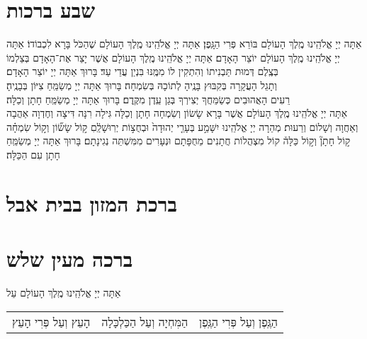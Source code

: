 \documentclass[twoside, openany, parskip=half, 11pt]{book}
\begin{document}
\section[שבע ברכות]{ שבע ברכות }

אַתָּה יְיָ אֱלֹהֵֽינוּ מֶֽלֶךְ הָעוֹלָם בּוֹרֵא פְּרִי הַגָּֽפֶן׃\hfill \break
{}
אַתָּה יְיָ אֱלֹהֵֽינוּ מֶֽלֶךְ הָעוֹלָם שֶׁהַכֹּל בָּרָא לִכְבוֹדוֹ׃\hfill \break
{}
אַתָּה יְיָ אֱלֹהֵֽינוּ מֶֽלֶךְ הָעוֹלָם יוֹצֵר הָאָדָם׃\hfill \break
{}
אַתָּה יְיָ אֱלֹהֵֽינוּ מֶֽלֶךְ הָעוֹלָם אֲשֶׁר יָצַר אֶת־הָאָדָם בְּצַלְמוֹ
בְּצֶֽלֶם דְּמוּת תַּבְנִיתוֹ וְהִתְקִין לוֹ מִמֶּֽנּוּ בִּנְיַן עֲדֵי עַד׃ בָּרוּךְ אַתָּה יְיָ יוֹצֵר הָאָדָם׃\\
וְתָגֵל הָעֲקָרָה בְּקִבּוּץ בָּנֶֽיהָ לְתוֹכָהּ בְּשִׂמְחָה׃
בָּרוּךְ אַתָּה יְיָ מְשַׂמֵּֽחַ צִיּוֹן בְּבָנֶֽיהָ׃\\
רֵעִים הָאֲהוּבִים כְּשַׂמֵּחֲךָ יְצִירְךָ בְּגַן עֵֽדֶן מִקֶּֽדֶם׃
בָּרוּךְ אַתָּה יְיָ מְשַׂמֵּֽחַ חָתָן וְכַלָּה׃\\
אַתָּה יְיָ אֱלֹהֵֽינוּ מֶֽלֶךְ הָעוֹלָם
אֲשֶׁר בָּרָא שָׂשׂוֹן וְשִׂמְחָה חָתָן וְכַלָּה גִּילָה רִנָּה דִּיצָה וְחֶדְוָה
אַהֲבָה וְאַחֲוָה וְשָׁלוֹם וְרֵעוּת׃
מְהֵרָה יְיָ אֱלֹהֵֽינוּ יִשָּׁמַ֣ע
בְּעָרֵ֤י יְהוּדָה֙ וּבְחֻצ֣וֹת יְרֽוּשָׁלַֽ֔םִ
ק֣וֹל שָׂשׂ֞וֹן וְק֣וֹל שִׂמְחָ֗ה ק֣וֹל חָתָן֘ וְק֣וֹל כַּלָּה֒
קוֹל מִצְהֲלוֹת חֲתָנִים מֵחֻפָּתָם וּנְעָרִים מִמִּשְׁתֵּה נְגִינָתָם׃
בָּרוּךְ אַתָּה יְיָ מְשַׂמֵּֽחַ חָתָן עִם הַכַּלָּה׃


\nextpage

\section[ברכת המזון בבית אבל]{ ברכת המזון בבית אבל }

\section[ברכה מעין שלש]{ ברכה מעין שלש }


אַתָּה יְיָ אֱלֹהֵֽינוּ מֶֽלֶךְ הָעוֹלָם עַל

\begin{tabular}{>{\centering\arraybackslash}m{} | >{\centering\arraybackslash}m{} | >{\centering\arraybackslash}m{}}

הָעֵץ וְעַל פְּרִי הָעֵץ
&
הַמִּחְיָה וְעַל הַכַּלְכָּלָה
&
הַגֶּֽפֶן וְעַל פְּרִי הַגֶּֽפֶן \\

\end{tabular}
\end{document}
